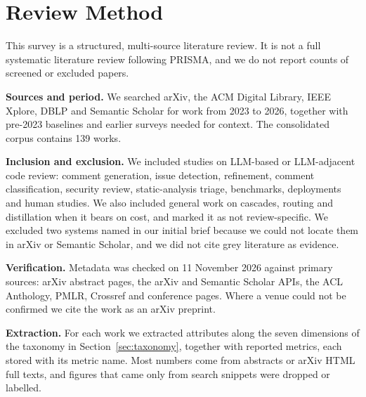 \section{Review Method}\label{sec:method}
This survey is a structured, multi-source literature review. It is not a full systematic literature review following PRISMA, and we do not report counts of screened or excluded papers.

\textbf{Sources and period.} We searched arXiv, the ACM Digital Library, IEEE Xplore, DBLP and Semantic Scholar for work from 2023 to 2026, together with pre-2023 baselines and earlier surveys needed for context. The consolidated corpus contains 139 works.

\textbf{Inclusion and exclusion.} We included studies on LLM-based or LLM-adjacent code review: comment generation, issue detection, refinement, comment classification, security review, static-analysis triage, benchmarks, deployments and human studies. We also included general work on cascades, routing and distillation when it bears on cost, and marked it as not review-specific. We excluded two systems named in our initial brief because we could not locate them in arXiv or Semantic Scholar, and we did not cite grey literature as evidence.

\textbf{Verification.} Metadata was checked on 11 November 2026 against primary sources: arXiv abstract pages, the arXiv and Semantic Scholar APIs, the ACL Anthology, PMLR, Crossref and conference pages. Where a venue could not be confirmed we cite the work as an arXiv preprint.

\textbf{Extraction.} For each work we extracted attributes along the seven dimensions of the taxonomy in Section~\ref{sec:taxonomy}, together with reported metrics, each stored with its metric name. Most numbers come from abstracts or arXiv HTML full texts, and figures that came only from search snippets were dropped or labelled.
